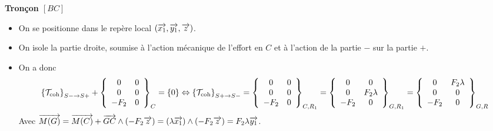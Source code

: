 \documentclass[10pt,fleqn]{article} %
\begin{document}
\begin{multicols}{1}
\textbf{Tronçon $[BC]$}
\begin{itemize}
\item On se positionne dans le repère local $\left(\vect{x_1},\vect{y_1},\vect{z}\right)$.
\item On isole la partie droite, soumise à l'action mécanique de l'effort en $C$ et à l'action de la partie $-$ sur la partie $+$.
\item On a donc $$
\torseurscoh_{S-\rightarrow S+} +
 \torseurcol{0}{0}{-F_2}{0}{0}{0}{C} 
 = \{0\} 
 \Leftrightarrow 
 \torseurscoh_{S+\rightarrow S-} 
 =
 \torseurcol{0}{0}{-F_2}{0}{0}{0}{C,R_1} 
  = \torseurcol{0}{0}{-F_2}{0}{F_2\lambda }{0}{G,R_1}
    = \torseurcol{0}{0}{-F_2}{F_2\lambda}{0 }{0}{G,R}
$$
Avec $\vect{M(G)} 
= \vect{M(C)}+\vect{GC}\wedge\left(-F_2 \vect{z}\right)
= \left(\lambda \vect{x_1} \right)\wedge\left(-F_2 \vect{z}\right)
= F_2\lambda \vect{y_1}
$.
\end{itemize}

\ifprof
\else
\end{multicols}
\fi
\end{document}
